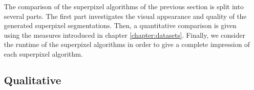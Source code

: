 The comparison of the superpixel algorithms of the previous section is split into several parts. The first part investigates the visual appearance and quality of the generated superpixel segmentations. Then, a quantitative comparison is given using the measures introduced in chapter \ref{chapter:datasets}. Finally, we consider the runtime of the superpixel algorithms in order to give a complete impression of each superpixel algorithm.



\subsection{Qualitative}
\label{subsection:evaluation-comparison-qualitative}



